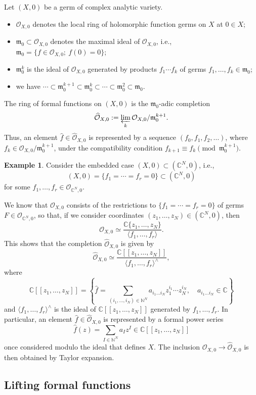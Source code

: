 \documentclass[11pt,twoside]{amsart}
\newcommand{\OO}{\mathcal O}
\newcommand{\mm}{\mathfrak m}
\newcommand{\wh}{\widehat}
\newcommand{\CC}{\mathbb C}
\newcommand{\NN}{\mathbb N}
\theoremstyle{definition}
\newtheorem{exe}{Example}
\begin{document}
Let $(X,0)$ be a germ of complex analytic variety.
\begin{itemize}
\item $\OO_{X,0}$ denotes the local ring of holomorphic function germs on $X$ at $0\in X$;
\item $\mm_0\subset\OO_{X,0}$ denotes the maximal ideal of $\OO_{X,0}$, i.e., $\mm_0=\{f\in\OO_{X,0};\ f(0)=0\}$;

\item $\mm_0^k$ is the ideal of $\OO_{X,0}$ generated by products
$f_1\cdots f_k$ of germs $f_1,\ldots,f_k\in\mm_0$;
\item we have $\cdots\subset \mm_0^{k+1}\subset \mm_0^k\subset\cdots\subset\mm_0^2\subset\mm_0$.
\end{itemize}

The ring of formal functions on $(X,0)$ is the $\mm_0$-adic completion
\[
  \widehat{\OO}_{X,0}:=\varprojlim_k \OO_{X,0}/\mm_0^{k+1}.
\]
Thus, an element $\wh f\in\widehat{\OO}_{X,0}$ is represented by a sequence
$(f_0,f_1,f_2,\ldots)$, where $f_k\in \OO_{X,0}/\mm_0^{k+1}$, under the compatibility condition $f_{k+1}\equiv f_k \pmod{\mm_0^{k+1}}$.

\begin{exe}\label{exem4}
Consider the embedded case $(X,0)\subset (\CC^N,0)$, i.e.,
  \[(X,0)=\{f_1=\cdots=f_r=0\}\subset(\CC^N,0)
\]
for some $f_1,\ldots,f_r\in\OO_{\CC^N,0}$.

We know that $\OO_{X,0}$ consists of the restrictions to
$\{f_1=\cdots=f_r=0\}$ of germs $F\in\OO_{\CC^N,0}$, so that, if we consider coordinates $(z_1,\ldots,z_N)\in(\CC^N,0)$, then
\[
  \OO_{X,0}\simeq \frac{\CC\{z_1,\ldots,z_N\}}{\langle f_1,\ldots,f_r\rangle}.
\]
This shows that the completion $\widehat{\OO}_{X,0}$ is given by
\[
  \widehat{\OO}_{X,0}
  \simeq
  \frac{\CC[[z_1,\ldots,z_N]]}{\langle f_1,\ldots,f_r\rangle^\wedge},
\]
where
\[
  \CC[[z_1,\ldots,z_N]]=
  \left\{\widehat f=\sum_{(i_1,\ldots,i_N)\in\NN^N}
  a_{i_1\ldots i_N} z_1^{i_1}\cdots z_N^{i_N},\quad
  a_{i_1\ldots i_N}\in\CC\right\}
\]
and $\langle f_1,\ldots,f_r\rangle^\wedge$ is the ideal of $\CC[[z_1,\ldots,z_N]]$ generated by $f_1,\ldots,f_r$. In particular, an element $\wh f\in\widehat{\OO}_{X,0}$ is represented by a formal power series
\[
  \widehat f(z)=\sum_{I\in\NN^N} a_I z^I\in\CC[[z_1,\ldots,z_N]]
\]
once considered modulo the ideal that defines $X$. The inclusion $\OO_{X,0}\to \widehat{\OO}_{X,0}$ is then obtained by Taylor expansion.
\end{exe}

\subsection{Lifting formal functions}
\end{document}
